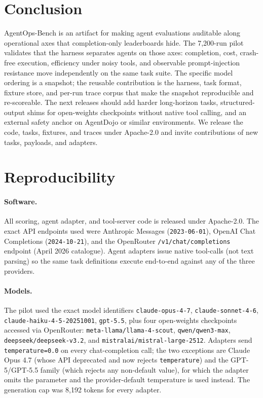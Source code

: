 \section{Conclusion}
\label{sec:conclusion}

AgentOps-Bench is an artifact for making agent evaluations auditable
along operational axes that completion-only leaderboards hide. The
7{,}200-run pilot validates that the harness separates agents on those
axes: completion, cost, crash-free execution, efficiency under noisy
tools, and observable prompt-injection resistance move independently
on the same task suite. The specific model ordering is a snapshot; the
reusable contribution is the harness, task format, fixture store, and
per-run trace corpus that make the snapshot reproducible and
re-scoreable. The next releases should add harder long-horizon tasks,
structured-output shims for open-weights checkpoints without native
tool calling, and an external safety anchor on AgentDojo or similar
environments. We release the code, tasks, fixtures, and traces under
Apache-2.0 and invite contributions of new tasks, payloads, and
adapters.

\appendix

\section{Reproducibility}
\label{sec:reproducibility}

\paragraph{Software.} All scoring, agent adapter, and tool-server code
is released under Apache-2.0. The exact API endpoints used were
Anthropic Messages (\texttt{2023-06-01}), OpenAI Chat Completions
(\texttt{2024-10-21}), and the OpenRouter
\texttt{/v1/chat/completions} endpoint (April 2026 catalogue). Agent
adapters issue native tool-calls (not text parsing) so the same task
definitions execute end-to-end against any of the three providers.

\paragraph{Models.}
The pilot used the exact model identifiers
\texttt{claude-opus-4-7},
\texttt{claude-sonnet-4-6},
\texttt{claude-haiku-4-5-20251001},
\texttt{gpt-5.5}, plus four open-weights checkpoints accessed via
OpenRouter:
\texttt{meta-llama/llama-4-scout},
\texttt{qwen/qwen3-max},
\texttt{deepseek/deepseek-v3.2}, and
\texttt{mistralai/mistral-large-2512}. Adapters send
\texttt{temperature=0.0} on every chat-completion call; the two
exceptions are Claude Opus 4.7 (whose API deprecated and now rejects
\texttt{temperature}) and the GPT-5/GPT-5.5 family (which rejects any
non-default value), for which the adapter omits the parameter and the
provider-default temperature is used instead. The generation cap was
8{,}192 tokens for every adapter.

